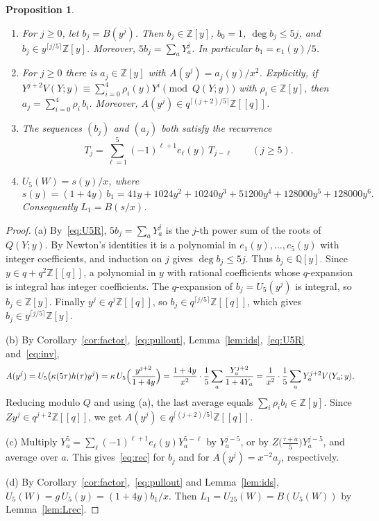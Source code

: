 \documentclass[11pt]{article}
\newtheorem{proposition}[theorem]{Proposition}
\theoremstyle{definition}
\theoremstyle{remark}
\numberwithin{equation}{section}
\newcommand{\Z}{\mathbb{Z}}
\newcommand{\Q}{\mathbb{Q}}
\begin{document}
\begin{proposition}\label{prop:AB}
\begin{enumerate}[label=\textup{(\alph*)}]
\item For $j\ge0$, let $b_j=B(y^j)$. Then $b_j\in\Z[y]$, $b_0=1$, $\deg b_j\le5j$, and $b_j\in y^{\lceil j/5\rceil}\Z[y]$. Moreover, $5b_j=\sum_aY_a^j$. In particular $b_1=e_1(y)/5$.
\item For $j\ge0$ there is $a_j\in\Z[y]$ with $A(y^j)=a_j(y)/x^2$. Explicitly, if $Y^{j+2}V(Y;y)\equiv\sum_{i=0}^4\rho_{i}(y)Y^i\pmod{Q(Y;y)}$ with $\rho_i\in\Z[y]$, then $a_j=\sum_{i=0}^4\rho_i\,b_i$. Moreover, $A(y^j)\in q^{\lceil(j+2)/5\rceil}\Z[[q]]$.
\item The sequences $(b_j)$ and $(a_j)$ both satisfy the recurrence
\begin{equation}\label{eq:rec}
T_j=\sum_{\ell=1}^5(-1)^{\ell+1}e_\ell(y)\,T_{j-\ell}\qquad(j\ge5).
\end{equation}
\item $U_5(W)=s(y)/x$, where
\[
s(y)=(1+4y)\,b_1=41y+1024y^2+10240y^3+51200y^4+128000y^5+128000y^6.
\]
Consequently $L_1=B(s/x)$.
\end{enumerate}
\end{proposition}

\begin{proof}
(a) By~\eqref{eq:U5R}, $5b_j=\sum_aY_a^j$ is the $j$-th power sum of the roots of $Q(Y;y)$. By Newton's identities it is a polynomial in $e_1(y),\dots,e_5(y)$ with integer coefficients, and induction on $j$ gives $\deg b_j\le5j$. Thus $b_j\in\Q[y]$. Since $y\in q+q^2\Z[[q]]$, a polynomial in $y$ with rational coefficients whose $q$-expansion is integral has integer coefficients. The $q$-expansion of $b_j=U_5(y^j)$ is integral, so $b_j\in\Z[y]$. Finally $y^j\in q^j\Z[[q]]$, so $b_j\in q^{\lceil j/5\rceil}\Z[[q]]$, which gives $b_j\in y^{\lceil j/5\rceil}\Z[y]$.

(b) By Corollary~\ref{cor:factor},~\eqref{eq:pullout}, Lemma~\ref{lem:ids},~\eqref{eq:U5R} and~\eqref{eq:inv},
\[
A(y^j)=U_5\bigl(\kappa(5\tau)h(\tau)y^j\bigr)=\kappa\,U_5\Bigl(\frac{y^{j+2}}{1+4y}\Bigr)=\frac{1+4y}{x^2}\cdot\frac15\sum_a\frac{Y_a^{j+2}}{1+4Y_a}=\frac1{x^2}\cdot\frac15\sum_aY_a^{j+2}V(Y_a;y).
\]
Reducing modulo $Q$ and using (a), the last average equals $\sum_i\rho_ib_i\in\Z[y]$. Since $Zy^j\in q^{j+2}\Z[[q]]$, we get $A(y^j)\in q^{\lceil(j+2)/5\rceil}\Z[[q]]$.

(c) Multiply $Y_a^5=\sum_\ell(-1)^{\ell+1}e_\ell(y)Y_a^{5-\ell}$ by $Y_a^{j-5}$, or by $Z\bigl(\frac{\tau+a}5\bigr)Y_a^{j-5}$, and average over $a$. This gives~\eqref{eq:rec} for $b_j$ and for $A(y^j)=x^{-2}a_j$, respectively.

(d) By Corollary~\ref{cor:factor},~\eqref{eq:pullout} and Lemma~\ref{lem:ids}, $U_5(W)=g\,U_5(y)=(1+4y)b_1/x$. Then $L_1=U_{25}(W)=B(U_5(W))$ by Lemma~\ref{lem:Lrec}.
\end{proof}
\end{document}
